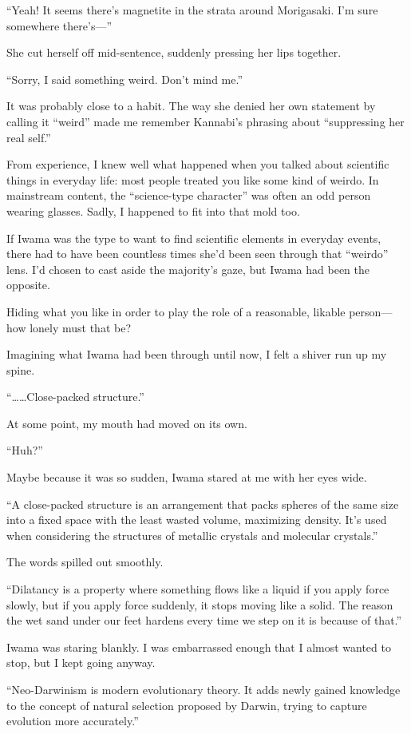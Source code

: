 \documentclass[
    a4paper,
    12pt,
    twoside,
    openany,
    UTF8,
    fontset=windows
]{ctexbook}
\begin{document}
``Yeah! It seems there's magnetite in the strata around Morigasaki. I'm sure somewhere there's---''

She cut herself off mid-sentence, suddenly pressing her lips together.

``Sorry, I said something weird. Don't mind me.''

It was probably close to a habit. The way she denied her own statement by calling it ``weird'' made me remember Kannabi's phrasing about ``suppressing her real self.''

From experience, I knew well what happened when you talked about scientific things in everyday life: most people treated you like some kind of weirdo. In mainstream content, the ``science-type character'' was often an odd person wearing glasses. Sadly, I happened to fit into that mold too.

If Iwama was the type to want to find scientific elements in everyday events, there had to have been countless times she'd been seen through that ``weirdo'' lens. I'd chosen to cast aside the majority's gaze, but Iwama had been the opposite.

Hiding what you like in order to play the role of a reasonable, likable person---how lonely must that be?

Imagining what Iwama had been through until now, I felt a shiver run up my spine.

``\dots\dots Close-packed structure.''

At some point, my mouth had moved on its own.

``Huh?''

Maybe because it was so sudden, Iwama stared at me with her eyes wide.

``A close-packed structure is an arrangement that packs spheres of the same size into a fixed space with the least wasted volume, maximizing density. It's used when considering the structures of metallic crystals and molecular crystals.''

The words spilled out smoothly.

``Dilatancy is a property where something flows like a liquid if you apply force slowly, but if you apply force suddenly, it stops moving like a solid. The reason the wet sand under our feet hardens every time we step on it is because of that.''

Iwama was staring blankly. I was embarrassed enough that I almost wanted to stop, but I kept going anyway.

``Neo-Darwinism is modern evolutionary theory. It adds newly gained knowledge to the concept of natural selection proposed by Darwin, trying to capture evolution more accurately.''
\end{document}
